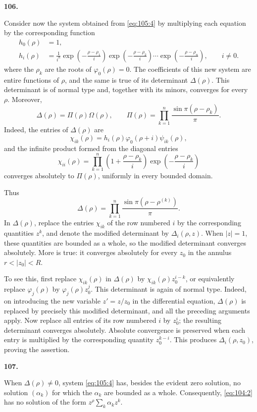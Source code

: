 \documentclass[
  paper=b5,
  fontsize=13pt,
  twoside=true,
  open=any,
  bookmarkpackage=false,
  chapterprefix=true,
  headings=normal
]{scrbook}
\theoremstyle{definition}
\newcommand{\numberedparagraph}[1]{%
  \par\medskip\phantomsection\label{sec:#1}%
  \noindent\textbf{#1.}\enspace
}
\begin{document}
\numberedparagraph{106}
Consider now the system obtained from \eqref{eq:105:4} by multiplying each
equation by the corresponding function
\[
  \begin{aligned}
    h_0(\rho)&=1,\\
    h_i(\rho)&=\frac1{i^n}
    \exp\left(-\frac{\rho-\rho_1}{i}\right)
    \exp\left(-\frac{\rho-\rho_2}{i}\right)\cdots
    \exp\left(-\frac{\rho-\rho_n}{i}\right),
    \qquad i\ne0.
  \end{aligned}
\]
where the \(\rho_k\) are the roots of \(\varphi_0(\rho)=0\).  The
coefficients of this new system are entire functions of \(\rho\), and the same
is true of its determinant \(\Delta(\rho)\).  This determinant is of normal
type and, together with its minors, converges for every \(\rho\).  Moreover,
\[
  \Delta(\rho)=\Pi(\rho)\Omega(\rho),
  \qquad
  \Pi(\rho)=\prod_{k=1}^{n}\frac{\sin\pi(\rho-\rho_k)}{\pi}.
\]
Indeed, the entries of \(\Delta(\rho)\) are
\[
  \chi_{ik}(\rho)=h_i(\rho)\varphi_0(\rho+i)\psi_{ik}(\rho),
\]
and the infinite product formed from the diagonal entries
\[
  \chi_{ii}(\rho)=
  \prod_{k=1}^{n}
  \left(1+\frac{\rho-\rho_k}{i}\right)
  \exp\left(-\frac{\rho-\rho_k}{i}\right)
\]
converges absolutely to \(\Pi(\rho)\), uniformly in every bounded domain.

Thus
\[
  \Delta(\rho)=\prod_{k=1}^{n}
  \frac{\sin\pi(\rho-\rho^{(k)})}{\pi}.
\]
In \(\Delta(\rho)\), replace the entries \(\chi_{ik}\) of the row numbered
\(i\) by the corresponding quantities \(z^k\), and denote the modified
determinant by \(\Delta_i(\rho,z)\).  When \(|z|=1\), these quantities are
bounded as a whole, so the modified determinant converges absolutely.  More is
true: it converges absolutely for every \(z_0\) in the annulus
\(r<|z_0|<R\).

To see this, first replace \(\chi_{ik}(\rho)\) in \(\Delta(\rho)\) by
\(\chi_{ik}(\rho)z_0^{i-k}\), or equivalently replace
\(\varphi_j(\rho)\) by \(\varphi_j(\rho)z_0^j\).  This determinant is again of
normal type.  Indeed, on introducing the new variable \(z'=z/z_0\) in the
differential equation, \(\Delta(\rho)\) is replaced by precisely this modified
determinant, and all the preceding arguments apply.  Now replace all entries
of its row numbered \(i\) by \(z_0^i\); the resulting determinant converges
absolutely.  Absolute convergence is preserved when each entry is multiplied
by the corresponding quantity \(z_0^{k-i}\).  This produces
\(\Delta_i(\rho,z_0)\), proving the assertion.

\numberedparagraph{107}
When \(\Delta(\rho)\ne0\), system \eqref{eq:105:4} has, besides the evident
zero solution, no solution \((\alpha_k)\) for which the \(\alpha_k\) are
bounded as a whole.  Consequently, \eqref{eq:104:2} has no solution of the
form \(z^\rho\sum_k\alpha_kz^k\).
\end{document}

